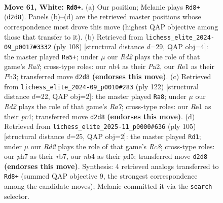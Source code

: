 \documentclass[11pt]{article}
\begin{document}
\clearpage

\begin{figure}[p]\centering
\begin{subfigure}{0.46\textwidth}\centering
\resizebox{\linewidth}{!}{%
\newchessgame
\chessboard[
  setfen={1k6/1p5p/6pP/p4p2/1n3P2/r7/3R3K/4R3 w - - 9 61},
  showmover=false,
  pgfstyle=straightmove, color=movearrow, markmove={d2-d8}
]}
\caption{}
\end{subfigure}\hfill
\begin{subfigure}{0.46\textwidth}\centering
\resizebox{\linewidth}{!}{%
\newchessgame
\chessboard[
  setfen={8/7p/1r4p1/4kp2/8/R3K1PP/P7/8 w - - 1 55},
  showmover=false,
  pgfstyle=straightmove, color=movearrow, markmove={a3-a5}
]}
\caption{}
\end{subfigure}
\\[4pt]
\begin{subfigure}{0.46\textwidth}\centering
\resizebox{\linewidth}{!}{%
\newchessgame
\chessboard[
  setfen={8/RK4pk/8/1p2n2p/1Pp4P/8/2r5/8 w - - 15 62},
  showmover=false,
  pgfstyle=straightmove, color=movearrow, markmove={a7-a8}
]}
\caption{}
\end{subfigure}\hfill
\begin{subfigure}{0.46\textwidth}\centering
\resizebox{\linewidth}{!}{%
\newchessgame
\chessboard[
  setfen={8/1R6/8/3P4/6p1/p3P1P1/5PK1/k1r5 b - - 0 53},
  showmover=false,
  pgfstyle=straightmove, color=movearrow, markmove={c1-d1}
]}
\caption{}
\end{subfigure}
\caption{\textbf{Move 61, White: \texttt{Rd8+}.} (a) Our position; Melanie plays \texttt{Rd8+} (\texttt{d2d8}). Panels (b)--(d) are the retrieved master positions whose correspondence most drove this move (highest QAP objective among those that transfer to it). (b) Retrieved from \texttt{lichess\_elite\_2024-09\_p0017\#3332} (ply 108) [structural distance $d$=29, QAP obj=4]: the master played \texttt{Ra5+}; under $\mu$ our \emph{Rd2} plays the role of that game's \emph{Ra3}; cross-type roles: our \emph{n}b4 as their \emph{P}a2, our \emph{R}e1 as their \emph{P}h3; transferred move \texttt{d2d8} \textbf{(endorses this move)}. (c) Retrieved from \texttt{lichess\_elite\_2024-09\_p0010\#283} (ply 122) [structural distance $d$=22, QAP obj=2]: the master played \texttt{Ra8}; under $\mu$ our \emph{Rd2} plays the role of that game's \emph{Ra7}; cross-type roles: our \emph{R}e1 as their \emph{p}c4; transferred move \texttt{d2d8} \textbf{(endorses this move)}. (d) Retrieved from \texttt{lichess\_elite\_2025-11\_p0000\#636} (ply 105) [structural distance $d$=25, QAP obj=2]: the master played \texttt{Rd1}; under $\mu$ our \emph{Rd2} plays the role of that game's \emph{Rc8}; cross-type roles: our \emph{p}h7 as their \emph{r}b7, our \emph{n}b4 as their \emph{p}d5; transferred move \texttt{d2d8} \textbf{(endorses this move)}. Synthesis: 4 retrieved analogs transferred to \texttt{Rd8+} (summed QAP objective 9, the strongest correspondence among the candidate moves); Melanie committed it via the \texttt{search} selector.}
\label{fig:thought-m120}
\end{figure}
\end{document}
